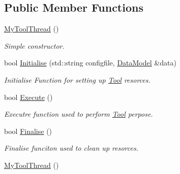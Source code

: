 \subsection*{Public Member Functions}
\begin{DoxyCompactItemize}
\item 
\hypertarget{classMyToolThread_a66c6fc304a8d62436281598d988dd845}{\hyperlink{classMyToolThread_a66c6fc304a8d62436281598d988dd845}{My\-Tool\-Thread} ()}\label{classMyToolThread_a66c6fc304a8d62436281598d988dd845}

\begin{DoxyCompactList}\small\item\em Simple constructor. \end{DoxyCompactList}\item 
bool \hyperlink{classMyToolThread_adc7ab1ab74fc1564f07e52e63383d679}{Initialise} (std\-::string configfile, \hyperlink{classDataModel}{Data\-Model} \&data)
\begin{DoxyCompactList}\small\item\em Initialise Function for setting up \hyperlink{classTool}{Tool} resorces. \end{DoxyCompactList}\item 
\hypertarget{classMyToolThread_a9b582cd202d5578682d57d973988df3c}{bool \hyperlink{classMyToolThread_a9b582cd202d5578682d57d973988df3c}{Execute} ()}\label{classMyToolThread_a9b582cd202d5578682d57d973988df3c}

\begin{DoxyCompactList}\small\item\em Executre function used to perform \hyperlink{classTool}{Tool} perpose. \end{DoxyCompactList}\item 
\hypertarget{classMyToolThread_aa51e385684efcb19f1c039b96653070e}{bool \hyperlink{classMyToolThread_aa51e385684efcb19f1c039b96653070e}{Finalise} ()}\label{classMyToolThread_aa51e385684efcb19f1c039b96653070e}

\begin{DoxyCompactList}\small\item\em Finalise funciton used to clean up resorces. \end{DoxyCompactList}\item 
\hypertarget{classMyToolThread_a66c6fc304a8d62436281598d988dd845}{\hyperlink{classMyToolThread_a66c6fc304a8d62436281598d988dd845}{My\-Tool\-Thread} ()}\label{classMyToolThread_a66c6fc304a8d62436281598d988dd845}


\end{DoxyCompactItemize}
